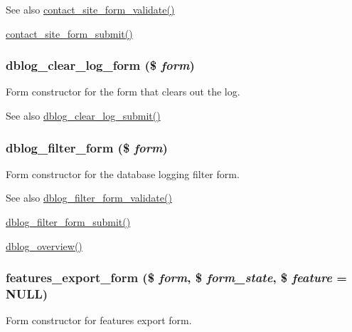\begin{DoxySeeAlso}{See also}
\hyperlink{contact_8pages_8inc_a548e38faaf205c6ac81ad3c91c7f7de1}{contact\_\-site\_\-form\_\-validate()} 

\hyperlink{contact_8pages_8inc_a270bdc78a9bbba16b7f4efe1cbe1cc4d}{contact\_\-site\_\-form\_\-submit()} 
\end{DoxySeeAlso}
\hypertarget{group__forms_gad4ec60fb6fd40f5ae8691709f2b9affb}{
\subsubsection[{dblog\_\-clear\_\-log\_\-form}]{\setlength{\rightskip}{0pt plus 5cm}dblog\_\-clear\_\-log\_\-form (\$ {\em form})}}
\label{group__forms_gad4ec60fb6fd40f5ae8691709f2b9affb}
Form constructor for the form that clears out the log.

\begin{DoxySeeAlso}{See also}
\hyperlink{dblog_8admin_8inc_aaac30c26ee5c21e148bd0783855f2a87}{dblog\_\-clear\_\-log\_\-submit()} 
\end{DoxySeeAlso}
\hypertarget{group__forms_ga1baa51b833eb4a3831b4319d4c20ad19}{
\subsubsection[{dblog\_\-filter\_\-form}]{\setlength{\rightskip}{0pt plus 5cm}dblog\_\-filter\_\-form (\$ {\em form})}}
\label{group__forms_ga1baa51b833eb4a3831b4319d4c20ad19}
Form constructor for the database logging filter form.

\begin{DoxySeeAlso}{See also}
\hyperlink{dblog_8admin_8inc_a8f88e6f1bf9010761546bbad59189b0f}{dblog\_\-filter\_\-form\_\-validate()} 

\hyperlink{dblog_8admin_8inc_a817953760089fe9caf59d187d3784433}{dblog\_\-filter\_\-form\_\-submit()} 

\hyperlink{group__logging__severity__levels_ga3b74d083df84c683ed01c7a5468eee12}{dblog\_\-overview()} 
\end{DoxySeeAlso}
\hypertarget{group__forms_gac6d72d74ab676748b1197536446c1063}{
\subsubsection[{features\_\-export\_\-form}]{\setlength{\rightskip}{0pt plus 5cm}features\_\-export\_\-form (\$ {\em form}, \/  \$ {\em form\_\-state}, \/  \$ {\em feature} = {\ttfamily NULL})}}
\label{group__forms_gac6d72d74ab676748b1197536446c1063}
Form constructor for features export form.

